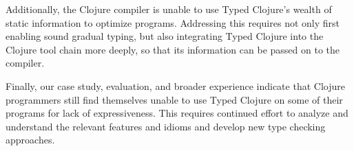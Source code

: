 Additionally, the Clojure compiler is unable to use Typed Clojure's
wealth of static information to optimize programs. Addressing this
requires not only first enabling sound gradual typing, but also
integrating Typed Clojure into the Clojure tool chain more deeply, so
that its information can be passed on to the compiler. 

Finally, our case study, evaluation, and broader experience indicate that Clojure
programmers still find themselves unable to use Typed Clojure on some
of their programs for lack of expressiveness. This requires continued
effort to analyze and understand the relevant features and idioms and
develop new type checking approaches.
